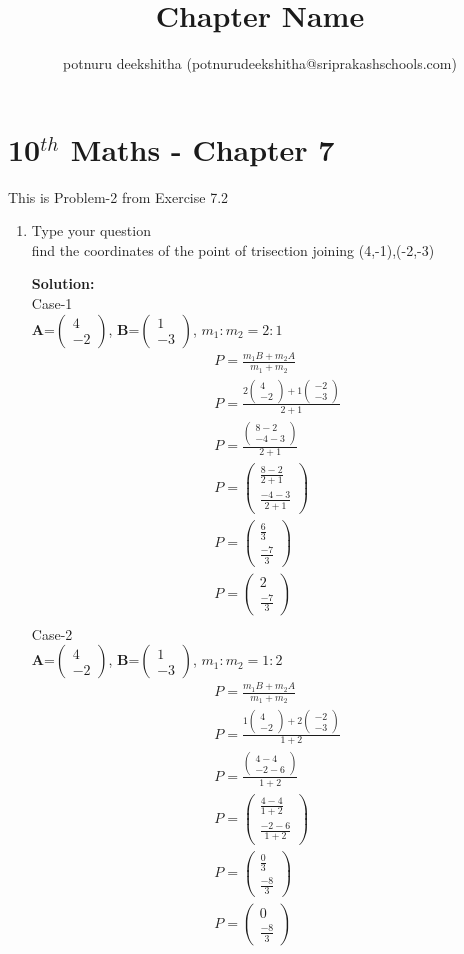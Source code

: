 \documentclass[12pt]{article}
\title{Chapter Name}
\author{potnuru deekshitha (potnurudeekshitha@sriprakashschools.com)}
\newcommand{\myvec}[1]{\ensuremath{\begin{pmatrix}#1\end{pmatrix}}}
\newcommand{\solution}{\noindent \textbf{Solution: }}
\let\vec\mathbf
\begin{document}
\maketitle
\section*{10$^{th}$ Maths - Chapter 7}
This is Problem-2 from Exercise 7.2
\begin{enumerate}
\item Type your question \\ find the coordinates of the point of trisection joining (4,-1),(-2,-3)

\solution\\
Case-1\\
$\vec{A}$=\myvec{4\\-2}, $\vec{B}$=\myvec{1\\-3},
$m_1:m_2=2:1$
\begin{align}
&P=\frac{m_1B+m_2A}{m_1+m_2}\\
&P=\frac{2\myvec{4\\-2}+1\myvec{-2\\-3}}{2+1}\\
&P=\frac{\myvec{8-2\\-4-3}}{2+1}\\
&P=\myvec{\frac{8-2}{2+1}\\\frac{-4-3}{2+1}}\\
&P=\myvec{\frac{6}{3}\\\frac{-7}{3}}\\
&P=\myvec{2\\\frac{-7}{3}}\\
\end{align}
Case-2\\
$\vec{A}$=\myvec{4\\-2}, $\vec{B}$=\myvec{1\\-3},
$m_1:m_2=1:2$
\begin{align}
&P=\frac{m_1B+m_2A}{m_1+m_2}\\
&P=\frac{1\myvec{4\\-2}+2\myvec{-2\\-3}}{1+2}\\
&P=\frac{\myvec{4-4\\-2-6}}{1+2}\\
&P=\myvec{\frac{4-4}{1+2}\\\frac{-2-6}{1+2}}\\
&P=\myvec{\frac{0}{3}\\\frac{-8}{3}}\\
&P=\myvec{0\\\frac{-8}{3}}\\
\end{align}



\end{enumerate}
\end{document}
